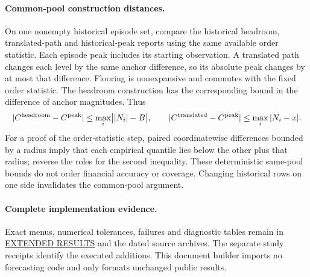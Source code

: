\documentclass[11pt,a4paper]{article}
\begin{document}
\paragraph{Common-pool construction distances.}
On one nonempty historical episode set, compare the historical headroom,
translated-path and historical-peak reports using the same available order
statistic. Each episode peak includes its starting observation. A translated
path changes each level by the same anchor difference, so its absolute peak
changes by at most that difference. Flooring is nonexpansive and commutes with
the fixed order statistic. The headroom construction has the corresponding
bound in the difference of anchor magnitudes. Thus
\[
|C^{\rm headroom}-C^{\rm peak}|\le\max_i\bigl||N_i|-B\bigr|,\qquad
|C^{\rm translated}-C^{\rm peak}|\le\max_i|N_i-x|.
\]
For a proof of the order-statistic step, paired coordinatewise differences
bounded by a radius imply that each empirical quantile lies below the other
plus that radius; reverse the roles for the second inequality. These
deterministic same-pool bounds do not order financial accuracy or coverage.
Changing historical rows on one side invalidates the common-pool argument.

\paragraph{Complete implementation evidence.}
Exact menus, numerical tolerances, failures and diagnostic tables remain in
\href{https://github.com/ByronLi0207/financial-mathematics-paper-20261020/blob/revision-v7-final/EXTENDED_RESULTS.md}{EXTENDED RESULTS} and the dated source archives.
The separate study receipts identify the executed additions. This document
builder imports no forecasting code and only formats unchanged public results.
\end{document}
